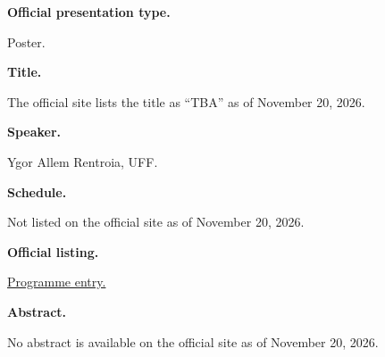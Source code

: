 \medskip\noindent
{\bf Official presentation type.}

Poster.

\medskip\noindent
{\bf Title.}

The official site lists the title as
``TBA'' as of November 20, 2026.

\medskip\noindent
{\bf Speaker.}

Ygor Allem Rentroia, UFF.

\medskip\noindent
{\bf Schedule.}

Not listed on the official site as of
November 20, 2026.

\medskip\noindent
{\bf Official listing.}

\href{%
https://sites.google.com/view/%
geoalgcompluff/legal/%
legal-2027-resumos#h.f3btoqn8ykd7%
}{Programme entry.}

\medskip\noindent
{\bf Abstract.}

No abstract is available on the
official site as of November 20, 2026.





